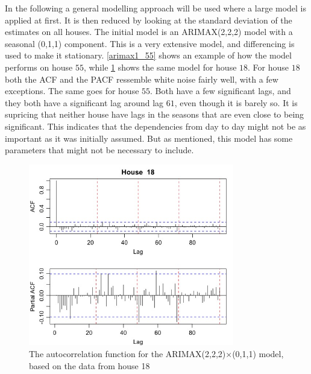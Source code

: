 In the following a general modelling approach will be used where a large model is applied at first. It is then reduced by looking at the standard deviation of the estimates on all houses. The initial model is an ARIMAX(2,2,2) model with a seasonal (0,1,1) component. This is a very extensive model, and differencing is used to make it stationary. \cref{arimax1_55} shows an example of how the model performs on house $55$, while \cref{arimax1_18} shows the same model for house $18$. For house $18$ both the ACF and the PACF ressemble white noise fairly well, with a few exceptions. The same goes for house $55$. Both have a few significant lags, and they both have a significant lag around lag $61$, even though it is barely so. It is supricing that neither house have lags in the seasons that are even close to being significant. This indicates that the dependencies from day to day might not be as important as it was initially assumed. But as mentioned, this model has some parameters that might not be necessary to include.




\begin{figure}
    \centering
    \includegraphics[width=0.8\textwidth]{../../../figures/arimax/Arimax1_18.jpeg}
    \caption{The autocorrelation function for the ARIMAX(2,2,2)$\times$(0,1,1) model, based on the data from house 18}
    \label{arimax1_18}
\end{figure}


